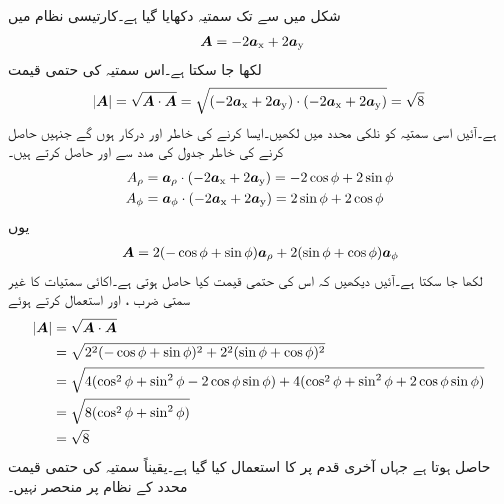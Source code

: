 شکل  میں  سے  تک سمتیہ  دکھایا گیا ہے۔کارتیسی نظام میں
\begin{align}\label{مساوات_سمتیہ_کارتیسی_نظام_سمتیہ_مثال}
{\ensuremath{{\boldsymbol{A}}}}&=-2{\boldsymbol{a}}_{\textup{x}}+2{\boldsymbol{a}}_{\textup{y}}
\end{align}
لکھا جا سکتا ہے۔اس سمتیہ کی حتمی قیمت
\begin{align*}
\abs{{{\boldsymbol{A}}}}= \sqrt{{{\boldsymbol{A}}} \cdot {\ensuremath{{\boldsymbol{A}}}}}=\sqrt{(-2{\boldsymbol{a}}_{\textup{x}}+2{\boldsymbol{a}}_{\textup{y}}) \cdot (-2{\boldsymbol{a}}_{\textup{x}}+2{\boldsymbol{a}}_{\textup{y}})}=\sqrt{8}
\end{align*}
ہے۔آئیں اسی سمتیہ کو نلکی محدد میں لکھیں۔ایسا کرنے کی خاطر  اور  درکار ہوں گے جنہیں حاصل کرنے کی خاطر جدول   کی مدد سے  اور  حاصل کرتے ہیں۔
\begin{align*}
A_\rho&={\boldsymbol{a}}_{\rho} \cdot (-2{\boldsymbol{a}}_{\textup{x}}+2{\boldsymbol{a}}_{\textup{y}})=-2 \cos \phi +2 \sin \phi\\
A_\phi&={\boldsymbol{a}}_{\phi} \cdot  (-2{\boldsymbol{a}}_{\textup{x}}+2{\boldsymbol{a}}_{\textup{y}})=2 \sin \phi +2 \cos \phi
\end{align*}
یوں
\begin{align}\label{مساوات_سمتیہ_نلکی_نظام_سمتیہ_مثال}
{\ensuremath{{\boldsymbol{A}}}}=2(- \cos \phi + \sin \phi) {\boldsymbol{a}}_{\rho} +2( \sin \phi + \cos \phi){\boldsymbol{a}}_{\phi}
\end{align}
لکھا جا سکتا ہے۔آئیں دیکھیں کہ اس کی حتمی قیمت کیا حاصل ہوتی ہے۔اکائی سمتیات کا غیر سمتی ضرب ،  اور  استعمال کرتے ہوئے
\begin{align*}
\abs{{{\boldsymbol{A}}}}&=\sqrt{{{\boldsymbol{A}}} \cdot {\ensuremath{{\boldsymbol{A}}}}}\\
&=\sqrt{2^2(- \cos \phi + \sin \phi)^2+2^2( \sin \phi + \cos \phi)^2 }\\
&=\sqrt{4(\cos^2 \phi +\sin^2 \phi -2 \cos \phi \sin \phi)+4(\cos^2 \phi +\sin^2 \phi +2 \cos \phi \sin \phi)}\\
&=\sqrt{8(\cos^2 \phi+\sin^2 \phi)}\\
&=\sqrt{8}
\end{align*}
حاصل ہوتا ہے جہاں آخری قدم پر  کا استعمال کیا گیا ہے۔یقیناً سمتیہ کی حتمی قیمت محدد کے نظام پر منحصر نہیں۔

